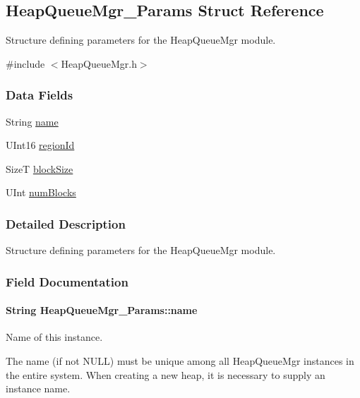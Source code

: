 \subsection{HeapQueueMgr\_\-Params Struct Reference}
\label{struct_heap_queue_mgr___params}


Structure defining parameters for the HeapQueueMgr module.  




{\ttfamily \#include $<$HeapQueueMgr.h$>$}

\subsubsection*{Data Fields}
\begin{DoxyCompactItemize}
\item 
String \hyperlink{struct_heap_queue_mgr___params_a7824367589cfc4964c1c262225e349b5}{name}
\item 
UInt16 \hyperlink{struct_heap_queue_mgr___params_a8b3bb33eb02bcf2acd93993c23b17ccd}{regionId}
\item 
SizeT \hyperlink{struct_heap_queue_mgr___params_aeb3a83b8f0c08c05c5c250edf36b8bac}{blockSize}
\item 
UInt \hyperlink{struct_heap_queue_mgr___params_aa8c44bb82eb7424aa86e55a2c03dd170}{numBlocks}
\end{DoxyCompactItemize}


\subsubsection{Detailed Description}
Structure defining parameters for the HeapQueueMgr module. 

\subsubsection{Field Documentation}
\paragraph[{name}]{\setlength{\rightskip}{0pt plus 5cm}String {\bf HeapQueueMgr\_\-Params::name}}\hfill\label{struct_heap_queue_mgr___params_a7824367589cfc4964c1c262225e349b5}
Name of this instance.

The name (if not NULL) must be unique among all HeapQueueMgr instances in the entire system. When creating a new heap, it is necessary to supply an instance name.

